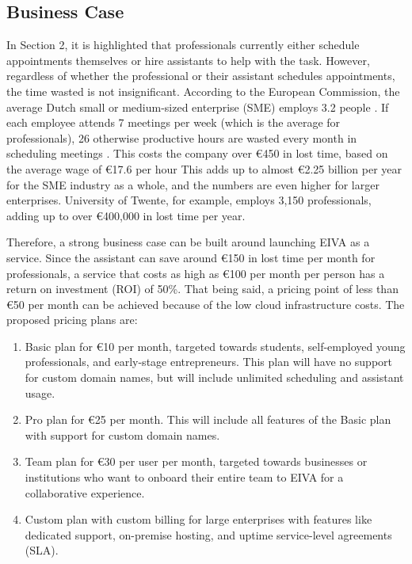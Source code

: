 \documentclass{article}
\begin{document}
\subsection{Business Case}

In Section 2, it is highlighted that professionals currently either schedule appointments themselves or hire assistants to help with the task. However, regardless of whether the professional or their assistant schedules appointments, the time wasted is not insignificant. According to the European Commission, the average Dutch small or medium-sized enterprise (SME) employs 3.2 people \cite{noauthor_2019_2019}. If each employee attends 7 meetings per week (which is the average for professionals), 26 otherwise productive hours are wasted every month in scheduling meetings \cite{kincaid_electronic_1985}. This costs the company over €450 in lost time, based on the average wage of €17.6 per hour \cite{wedia_salary_nodate} This adds up to almost €2.25 billion per year for the SME industry as a whole, and the numbers are even higher for larger enterprises. University of Twente, for example, employs 3,150 professionals, adding up to over €400,000 in lost time per year.

Therefore, a strong business case can be built around launching EIVA as a service. Since the assistant can save around €150 in lost time per month for professionals, a service that costs as high as €100 per month per person has a return on investment (ROI) of 50\%. That being said, a pricing point of less than €50 per month can be achieved because of the low cloud infrastructure costs. The proposed pricing plans are:

\begin{enumerate}
	\item Basic plan for €10 per month, targeted towards students, self-employed young professionals, and early-stage entrepreneurs. This plan will have no support for custom domain names, but will include unlimited scheduling and assistant usage.
	\item Pro plan for €25 per month. This will include all features of the Basic plan with support for custom domain names.
	\item Team plan for €30 per user per month, targeted towards businesses or institutions who want to onboard their entire team to EIVA for a collaborative experience.
	\item Custom plan with custom billing for large enterprises with features like dedicated support, on-premise hosting, and uptime service-level agreements (SLA).
\end{enumerate}
\end{document}
